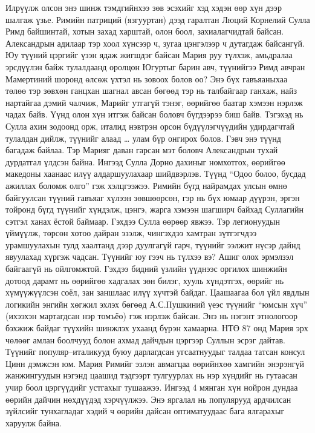 Илрүүлж олсон энэ шинж тэмдгийнхээ зөв эсэхийг хэд хэдэн өөр хүн дээр шалгаж үзье. Римийн патриций (язгууртан) дээд гаралтан Люций Корнелий Сулла Римд байшинтай, хотын захад харштай, олон боол, захиалагчидтай байсан. Александрын адилаар тэр хоол хүнсээр ч, зугаа цэнгэлээр ч дутагдаж байсангүй. Юу түүний цэргийг үзэн ядаж жигшдэг байсан Мария руу түлхэж, амьдралаа эрсдүүлэн байж тулалдаанд оролцон Югуртыг барин авч, түүнийгээ Римд авчран Мамертиний шоронд өлсөж үхтэл нь зовоох болов оо? Энэ бүх гавъяаныхаа төлөө тэр зөвхөн ганцхан шагнал авсан бөгөөд тэр нь талбайгаар ганхаж, найз нартайгаа дэмий чалчиж, Марийг утгагүй тэнэг, өөрийгөө баатар хэмээн нэрлэж чадах байв. Үүнд олон хүн итгэж байсан боловч бүгдээрээ биш байв. Тэгэхэд нь Сулла ахин зодоонд орж, италид нэвтрэн орсон бүдүүлэгчүүдийн удирдагчтай тулалдан дийлж, түүнийг алаад … улам бүр онгирох болов. Гэвч энэ түүнд багадаж байлаа. Тэр Марияг даван гарсан мэт боловч Александрын тухай дурдатгал үлдсэн байна. Ингээд Сулла Дорно дахиныг номхотгох, өөрийгөө македоны хаанаас илүү алдаршуулахаар шийдвэрлэв. Түүнд “Одоо болоо, бусдад ажиллах боломж олго” гэж хэлцгээжээ. Римийн бүгд найрамдах улсын өмнө байгуулсан түүний гавъяаг хүлээн зөвшөөрсөн, гэр нь бүх юмаар дүүрэн, эргэн тойронд бүгд түүнийг хүндэлж, цэнгэ, жарга хэмээн шагширч байхад Суллагийн сэтгэл ханах ёстой баймаар. Гэхдээ Сулла өөрөөр явжээ. Тэр легионуудын үймүүлж, төрсөн хотоо дайран эзэлж, чингэхдээ хамтран зүтгэгчдээ урамшуулахын тулд хаалтанд дээр дуулгагүй гарч, түүнийг ээлжит нүсэр дайнд явуулахад хүргэж чадсан. Түүнийг юу гээч нь түлхээ вэ? Ашиг олох эрмэлзэл байгаагүй нь ойлгомжтой. Гэхдээ бидний үзлийн үүднээс оргилох шинжийн дотоод дарамт нь өөрийгөө хадгалах зөн билэг, хууль хүндэтгэх, өөрийг нь хүмүүжүүлсэн соёл, зан заншлаас илүү хүчтэй байдаг.
Цаашаагаа бол үйл явдлын логикийн энгийн хөгжил эхлэх бөгөөд А.С.Пушкиний үеэс түүнийг “юмсын хүч” (ихээхэн мартагдсан нэр томъёо) гэж нэрлэж байсан. Энэ нь нэгэнт этнологоор бэхжиж байдаг түүхийн шинжлэх ухаанд бүрэн хамаарна. НТӨ 87 онд Мария эрх чөлөөг амлан боолчууд болон ахмад дайчдын цэргээр Суллын эсрэг дайтав. Түүнийг популяр–италикууд буюу дарлагдсан угсаатнуудыг талдаа татсан консул Цинн дэмжсэн юм. Мария Римийг эзлэн авмагцаа өөрийнхөө хамгийн энэрэнгүй жанжингуудын нэгэнд цаашид тэдгээрт тулгуурлах нь нэр хүндийг нь гутаасан учир боол цэргүүдийг устгахыг тушаажээ. Ингээд 4 мянган хүн нойрон дундаа өөрийн дайчин нөхдүүдэд хэрчүүлжээ. Энэ яргалал нь популярууд ардчилсан зүйлсийг тунхагладаг хэдий ч өөрийн дайсан оптиматуудаас бага ялгарахыг харуулж байна.
